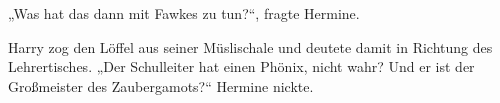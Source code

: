 „Was hat das dann mit Fawkes zu tun?“, fragte Hermine.

Harry zog den Löffel aus seiner Müslischale und deutete damit in Richtung des Lehrertisches. „Der Schulleiter hat einen Phönix, nicht wahr? Und er ist der Großmeister des Zaubergamots?“ Hermine nickte.
%
